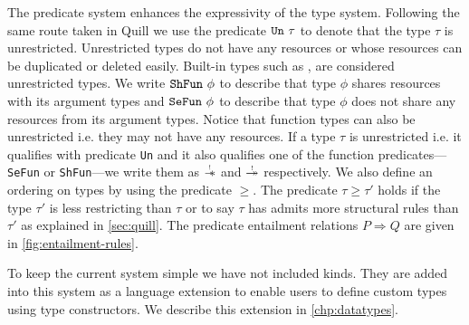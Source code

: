 The predicate system enhances the expressivity of the type system. Following the same route taken
in Quill \citep{morris_best_2016} we use the predicate $\texttt{Un}\ \tau$ to denote
that the type $\tau$ is unrestricted. Unrestricted types do not have any resources or whose resources can
be duplicated or deleted easily. Built-in types such as ,  are considered unrestricted types.
We write $\texttt{ShFun}\ \phi$ to describe that type $\phi$ shares resources with its
argument types and  $\texttt{SeFun}\ \phi$ to describe that type $\phi$ does not share any resources from its argument types.
Notice that function types can also be unrestricted i.e. they may not have any resources. If a type $\tau$ is unrestricted i.e. it qualifies with predicate
\texttt{Un} and it also qualifies one of the function predicates---\texttt{SeFun} or \texttt{ShFun}---we write
them as $\tightoverset{\scalebox{0.5}{!}}{\sepimp}$ and $\tightoverset{\scalebox{0.5}{!}}{\shimp}$ respectively.
We also define an ordering on types by using the predicate $\geq$. The predicate $\tau \geq \tau'$ holds if the type $\tau'$
is less restricting than $\tau$ or to say $\tau$ has admits more structural rules than $\tau'$ as explained in \cref{sec:quill}.
The predicate entailment relations $P \Rightarrow Q$ are given in \cref{fig:entailment-rules}.

To keep the current system simple we have not included kinds. They are added into this system as a language extension
to enable users to define custom types using type constructors. We describe this extension in \cref{chp:datatypes}.


